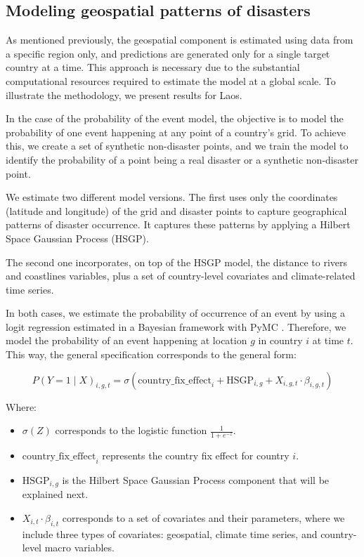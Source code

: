 \subsection{Modeling geospatial patterns of disasters}

As mentioned previously, the geospatial component is estimated using data from a specific region only, and predictions are generated only for a single target country at a time. This approach is necessary due to the substantial computational resources required to estimate the model at a global scale. To illustrate the methodology, we present results for Laos.

In the case of the probability of the event model, the objective is to model the probability of one event happening at any point of a country's grid. To achieve this, we create a set of synthetic non-disaster points, and we train the model to identify the probability of a point being a real disaster or a synthetic non-disaster point.

We estimate two different model versions. The first uses only the coordinates (latitude and longitude) of the grid and disaster points to capture geographical patterns of disaster occurrence. It captures these patterns by applying a Hilbert Space Gaussian Process (HSGP).

The second one incorporates, on top of the HSGP model, the distance to rivers and coastlines variables, plus a set of country-level covariates and climate-related time series.

In both cases, we estimate the probability of occurrence of an event by using a logit regression estimated in a Bayesian framework with PyMC \citep{abril2023pymc}. Therefore, we model the probability of an event happening at location $g$ in country $i$ at time $t$. This way, the general specification corresponds to the general form:

\begin{equation}
P(Y=1 \mid X)_{i,g,t} = \sigma\left( \text{country\_fix\_effect}_i + \text{HSGP}_{i,g} + X_{i,g,t} \cdot \beta_{i,g,t} \right)
\end{equation}

Where:

\begin{itemize}
    \item $\sigma(Z)$ corresponds to the logistic function $\frac{1}{1+e^{-z}}$.
    \item $\text{country\_fix\_effect}_i$ represents the country fix effect for country $i$.
    \item $\text{HSGP}_{i,g}$ is the Hilbert Space Gaussian Process component that will be explained next.
    \item $X_{i,t} \cdot \beta_{i,t}$ corresponds to a set of covariates and their parameters, where we include three types of covariates: geospatial, climate time series, and country-level macro variables.
\end{itemize}

